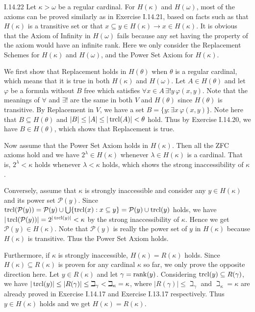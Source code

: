 \documentclass[12pt]{article}
\begin{document}
\begin{customthm}{I.14.22}
  Let $\kappa>\omega$ be a regular cardinal. For $H(\kappa)$ and $H(\omega)$, most of the axioms can be proved similarly as in Exercise I.14.21, based on facts such as that $H(\kappa)$ is a transitive set or that $x\subseteq y\in H(\kappa)\rightarrow x\in H(\kappa)$. It is obvious that the Axiom of Infinity in $H(\omega)$ fails because any set having the property of the axiom would have an infinite rank. Here we only consider the Replacement Schemes for $H(\kappa)$ and $H(\omega)$, and the Power Set Axiom for $H(\kappa)$.

  We first show that Replacement holds in $H(\theta)$ when $\theta$ is a regular cardinal, which means that it is true in both $H(\kappa)$ and $H(\omega)$. Let $A\in H(\theta)$ and let $\varphi$ be a formula without $B$ free which satisfies $\forall x\in A\,\exists!y\,\varphi(x,y)$. Note that the meanings of $\forall$ and $\exists!$ are the same in both $V$ and $H(\theta)$ since $H(\theta)$ is transitive. By Replacement in $V$, we have a set $B=\{y:\exists x\,\varphi(x,y)\}$. Note here that $B\subseteq H(\theta)$ and $|B|\leq|A|\leq|\mathop{\mathrm{trcl}}(A)|<\theta$ hold. Thus by Exercise I.14.20, we have $B\in H(\theta)$, which shows that Replacement is true.

  Now assume that the Power Set Axiom holds in $H(\kappa)$. Then all the ZFC axioms hold and we have $2^\lambda\in H(\kappa)$ whenever $\lambda\in H(\kappa)$ is a cardinal. That is, $2^\lambda<\kappa$ holds whenever $\lambda<\kappa$ holds, which shows the strong inaccessibility of $\kappa$.

  Conversely, assume that $\kappa$ is strongly inaccessible and consider any $y\in H(\kappa)$ and its power set $\mathcal{P}(y)$. Since $\mathop{\mathrm{trcl}}(\mathcal{P}(y))=\mathcal{P}(y)\cup\bigcup\{\mathop{\mathrm{trcl}}(x):x\subseteq y\}=\mathcal{P}(y)\cup\mathop{\mathrm{trcl}}(y)$ holds, we have $|\mathop{\mathrm{trcl}}(\mathcal{P}(y))|=2^{|\mathop{\mathrm{trcl}}(y)|}<\kappa$ by the strong inaccessibility of $\kappa$. Hence we get $\mathcal{P}(y)\in H(\kappa)$. Note that $\mathcal{P}(y)$ is really the power set of $y$ in $H(\kappa)$ because $H(\kappa)$ is transitive. Thus the Power Set Axiom holds.

  Furthermore, if $\kappa$ is strongly inaccessible, $H(\kappa)=R(\kappa)$ holds. Since $H(\kappa)\subseteq R(\kappa)$ is proven for any cardinal $\kappa$ so far, we only prove the opposite direction here. Let $y\in R(\kappa)$ and let $\gamma=\mathop{\mathrm{rank}}(y)$. Considering $\mathop{\mathrm{trcl}}(y)\subseteq R(\gamma)$, we have $|\mathop{\mathrm{trcl}}(y)|\leq|R(\gamma)|\leq\beth_\gamma<\beth_\kappa=\kappa$, where $|R(\gamma)|\leq\beth_\gamma$ and $\beth_\kappa=\kappa$ are already proved in Exercise I.14.17 and Exercise I.13.17 respectively. Thus $y\in H(\kappa)$ holds and we get $H(\kappa)=R(\kappa)$.
\end{customthm}
\end{document}
